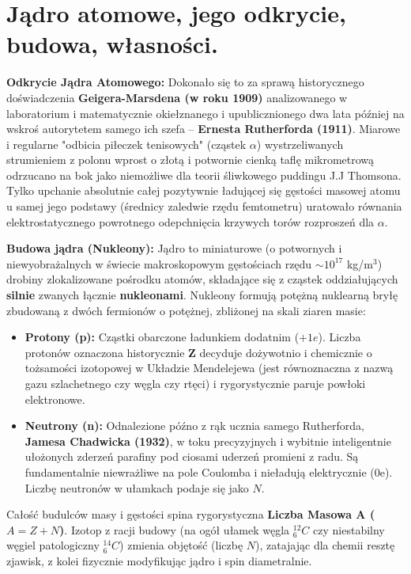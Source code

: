 \documentclass[11pt, a4paper]{article}
\begin{document}
\section{Jądro atomowe, jego odkrycie, budowa, własności.}

\textbf{Odkrycie Jądra Atomowego:}
Dokonało się to za sprawą historycznego doświadczenia \textbf{Geigera-Marsdena (w roku 1909)} analizowanego w laboratorium i matematycznie okiełznanego i upublicznionego dwa lata później na wskroś autorytetem samego ich szefa – \textbf{Ernesta Rutherforda (1911)}. Miarowe i regularne "odbicia piłeczek tenisowych" (cząstek $\alpha$) wystrzeliwanych strumieniem z polonu wprost o złotą i potwornie cienką taflę mikrometrową odrzucano na bok jako niemożliwe dla teorii śliwkowego puddingu J.J Thomsona. Tylko upchanie absolutnie całej pozytywnie ładującej się gęstości masowej atomu u samej jego podstawy (średnicy zaledwie rzędu femtometru) uratowało równania elektrostatycznego powrotnego odepchnięcia krzywych torów rozproszeń dla $\alpha$.

\textbf{Budowa jądra (Nukleony):}
Jądro to miniaturowe (o potwornych i niewyobrażalnych w świecie makroskopowym gęstościach rzędu $\sim 10^{17}$ kg/m$^3$) drobiny zlokalizowane pośrodku atomów, składające się z cząstek oddziałujących \textbf{silnie} zwanych łącznie \textbf{nukleonami}. Nukleony formują potężną nuklearną bryłę zbudowaną z dwóch fermionów o potężnej, zbliżonej na skali ziaren masie:
\begin{itemize}
    \item \textbf{Protony (p):} Cząstki obarczone ładunkiem dodatnim ($+1e$). Liczba protonów oznaczona historycznie \textbf{Z} decyduje dożywotnio i chemicznie o tożsamości izotopowej w Układzie Mendelejewa (jest równoznaczna z nazwą gazu szlachetnego czy węgla czy rtęci) i rygorystycznie paruje powłoki elektronowe.
    \item \textbf{Neutrony (n):} Odnalezione późno z rąk ucznia samego Rutherforda, \textbf{Jamesa Chadwicka (1932)}, w toku precyzyjnych i wybitnie inteligentnie ułożonych zderzeń parafiny pod ciosami uderzeń promieni z radu. Są fundamentalnie niewrażliwe na pole Coulomba i nieładują elektrycznie (0e). Liczbę neutronów w ułamkach podaje się jako $N$.
\end{itemize}
Całość budulców masy i gęstości spina rygorystyczna \textbf{Liczba Masowa A ($A= Z+N$)}. Izotop z racji budowy (na ogół ułamek węgla ${}^{12}_{6}C$ czy niestabilny węgiel patologiczny ${}^{14}_{6}C$) zmienia objętość (liczbę $N$), zatajając dla chemii resztę zjawisk, z kolei fizycznie modyfikując jądro i spin diametralnie.
\end{document}
